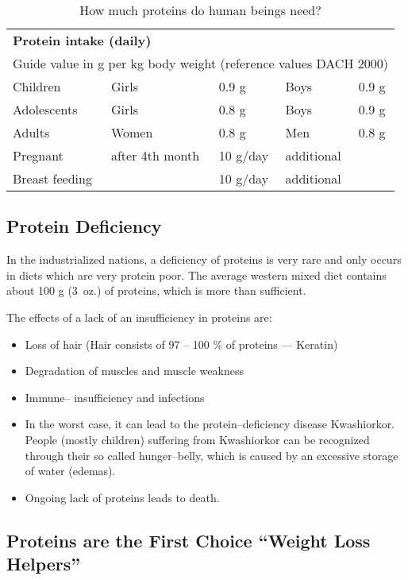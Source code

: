 \documentclass[../main.tex]{subfiles}
\begin{document}
  \begin{table}[htb!]
    \centering
    \begin{tabular}{lllll}
      \multicolumn{5}{l}{\textbf{Protein intake (daily)}} \\
      \multicolumn{5}{l}{Guide value in g per kg body weight (reference values DACH 2000)}\\
      \hline
      Children & Girls & 0.9 g & Boys & 0.9 g \\
      Adolescents & Girls & 0.8 g & Boys & 0.9 g \\
      Adults & Women & 0.8 g & Men & 0.8 g \\
      Pregnant & after 4th month & 10 g/day & additional \\
      Breast feeding &  & 10 g/day & additional \\ 
    \end{tabular}
    \caption{How much proteins do human beings need?}
  \end{table}

  \subsection{Protein Deficiency}

  In the industrialized nations, a deficiency of proteins is very rare and only occurs in diets which are very protein poor.
  The average western mixed diet contains about 100 g (3\ oz.) of proteins, which is more than sufficient.

  The effects of a lack of an insufficiency in proteins are:
  \begin{itemize}
  \item Loss of hair (Hair consists of 97 -- 100 \% of proteins --- Keratin)
  \item Degradation of muscles and muscle weakness
  \item Immune-- insufficiency and infections
  \item In the worst case, it can lead to the protein--deficiency disease Kwashiorkor.
    People (mostly children) suffering from Kwashiorkor can be recognized through their so called hunger--belly,
    which is caused by an excessive storage of water (edemas).
    \item Ongoing lack of proteins leads to death.
  \end{itemize}

  \subsection{Proteins are the First Choice ``Weight Loss Helpers''}
\end{document}
